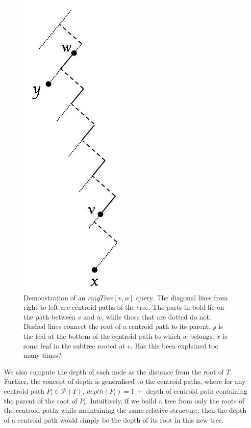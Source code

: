\documentclass{article}
\begin{document}
    \begin{figure}[h]
        \includegraphics[scale=0.5]{rmq}
        \centering
        \caption{Demonstration of an $rmqTree[v, w]$ query. The diagonal lines from right to left are centroid paths of the tree. The parts in bold lie on the path between $v$ and $w$, while those that are dotted do not. Dashed lines connect the root of a centroid path to its parent. $y$ is the leaf at the bottom of the centroid path to which $w$ belongs. $x$ is some leaf in the subtree rooted at $v$. {\color{red} Has this been explained too many times?}}
        \label{fig:rmq}
    \end{figure}

    We also compute the depth of each node as the distance from the root of $T$. Further, the concept of depth is generalised to the centroid paths, where for any centroid path $P_i \in \mathcal{P}(T)$, $depth(P_i) = 1\, +$ depth of centroid path containing the parent of the root of $P_i$. Intuitively, if we build a tree from only the roots of the centroid paths while maintaining the same relative structure, then the depth of a centroid path would simply be the depth of its root in this new tree.
    \newline
\end{document}
